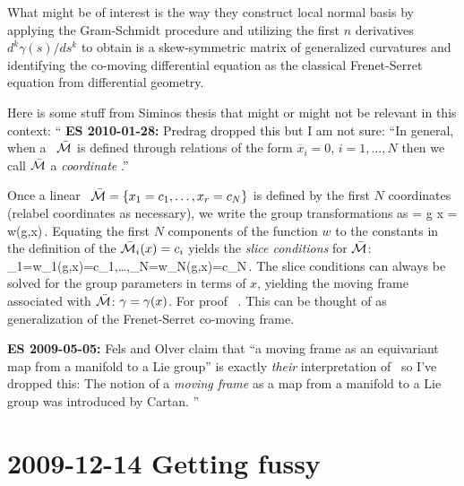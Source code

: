 \begin{description}
What might be of interest is the way they construct local
normal basis by applying the Gram-Schmidt procedure and
utilizing the first $n$ derivatives $d^k\gamma(s)/ds^k$ to
obtain is a skew-symmetric matrix of generalized curvatures
and identifying the co-moving differential equation as the
classical Frenet-Serret equation from differential geometry.

Here is some stuff from Siminos thesis that might or might not
be relevant in this context:
``
{\bf ES 2010-01-28:}
Predrag dropped this but I am not sure: ``In general,
when a \slice\ $\bar{\cal M}$ is defined through relations of the
form $\overline{x}_i=0$, $i=1,\ldots,N$ then we call $\bar{\cal M}$
a \emph{coordinate \slice}.''

Once a linear \slice\
$\bar{\cal M}=\{x_1=c_1,\ldots,x_r=c_N\}$ is defined by the first $N$
coordinates (relabel coordinates as necessary),
we write the group transformations as
\beq
	= g \cdot x = w(g,x)\,.
	\label{eq:transNorm}
\eeq
Equating the first $N$ components of the function $w$ to the
constants in the definition of the {\slice} $\bar{\cal M}_i(x)=c_i$
yields the \emph{slice conditions} for $\bar{\cal M}$:
\beq
	_1=w_1(g,x)=c_1,\ldots,_N=w_N(g,x)=c_N\,.
	\label{eq:normalization}
\eeq
The slice conditions  can always be
solved for the group parameters in terms of
$x$, yielding the moving frame associated with $\bar{\cal M}$:
$\gamma=\gamma(x)$. For proof
\cf~.
This can be thought of as generalization
of the Frenet-Serret co-moving frame.

{\bf ES 2009-05-05:}
Fels and Olver claim that ``a moving
frame as an equivariant map from a manifold to a Lie group''
is exactly \emph{their} interpretation of \mframes\
so I've dropped this: The notion of a {\em moving frame}
as a map from a manifold to a Lie group was introduced
by Cartan\rf{CartanMF}.
''

\end{description}

\section{2009-12-14 Getting fussy}

